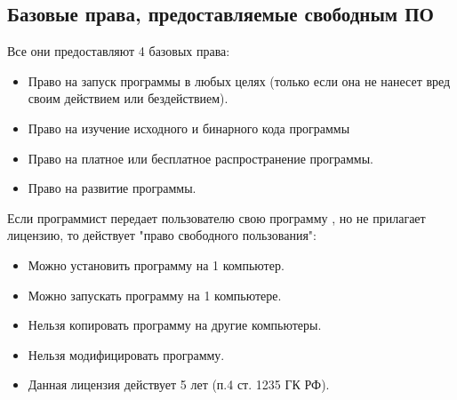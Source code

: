 \subsection{Базовые права, предоставляемые свободным ПО}
Все они предоставляют 4 базовых права:
\begin{itemize}
  \item Право на запуск программы в любых целях (только если она не нанесет вред своим действием или бездействием).
  \item Право на изучение исходного и бинарного кода программы
  \item Право на платное или бесплатное распространение программы.
  \item Право на развитие программы.
\end{itemize}
Если программист передает пользователю свою программу , но не прилагает лицензию, то действует "право свободного пользования":
\begin{itemize}
  \item Можно установить программу на 1 компьютер.
  \item Можно запускать программу на 1 компьютере.
  \item Нельзя копировать программу на другие компьютеры.
  \item Нельзя модифицировать программу.
  \item Данная лицензия действует 5 лет (п.4 ст. 1235 ГК РФ).
\end{itemize}
